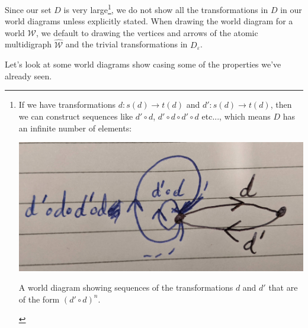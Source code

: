 Since our set $D$ is very large\footnote{
	If we have transformations $d: s(d) \to t(d)$ and $d': s(d) \to t(d)$, then we can construct sequences like $d' \circ d$, $d' \circ d \circ d' \circ d$ etc..., which means $D$ has an infinite number of elements:
	\begin{center}
		\FloatBarrier
		\captionsetup{type=figure}
		\includegraphics[width=1.0\linewidth]{2MathematicalFramework/Images/D_commonly_large.jpg}
		\caption{A world diagram showing sequences of the transformations $d$ and $d'$ that are of the form $(d' \circ d)^{n}$.}
	\end{center}
}, we do not show all the transformations in $D$ in our world diagrams unless explicitly stated.
When drawing the world diagram for a world $\mathscr{W}$, we default to drawing the vertices and arrows of the atomic multidigraph $\hat{\mathscr{W}}$ and the trivial transformations in $D_{\varepsilon}$.

Let's look at some world diagrams show casing some of the properties we've already seen.

